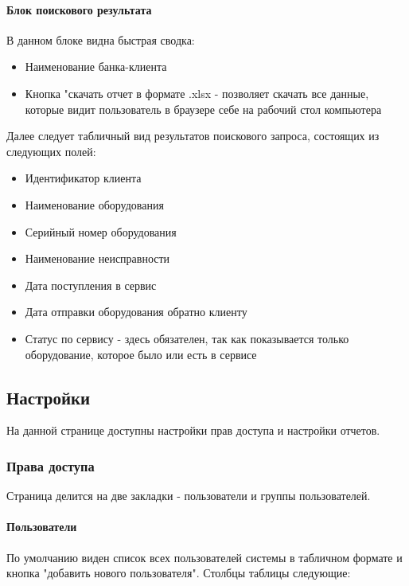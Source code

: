 \documentclass[DIV=calc, paper=a4, fontsize=11pt]{scrartcl} %
\begin{document}
\paragraph{Блок поискового результата}
В данном блоке видна быстрая сводка:

\begin{itemize}
	\item Наименование банка-клиента
	\item Кнопка "скачать отчет в формате .xlsx - позволяет скачать все данные, которые видит пользователь в браузере себе на рабочий стол компьютера
\end{itemize}

Далее следует табличный вид результатов поискового запроса, состоящих из следующих полей:

\begin{itemize}
	\item Идентификатор клиента
	\item Наименование оборудования
	\item Серийный номер оборудования
	\item Наименование неисправности
	\item Дата поступления в сервис
	\item Дата отправки оборудования обратно клиенту
	\item Статус по сервису - здесь обязателен, так как показывается только оборудование, которое было или есть в сервисе
\end{itemize}

\subsection{Настройки}

На данной странице доступны настройки прав доступа и настройки отчетов.

\subsubsection{Права доступа}

Страница делится на две закладки - пользователи и группы пользователей.

\paragraph{Пользователи}

По умолчанию виден список всех пользователей системы в табличном формате и кнопка "добавить нового пользователя". Столбцы таблицы следующие:
\end{document}
